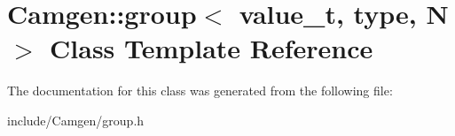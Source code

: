 \hypertarget{a00256}{}\section{Camgen\+:\+:group$<$ value\+\_\+t, type, N $>$ Class Template Reference}
\label{a00256}


The documentation for this class was generated from the following file\+:\begin{DoxyCompactItemize}
\item 
include/\+Camgen/group.\+h\end{DoxyCompactItemize}
